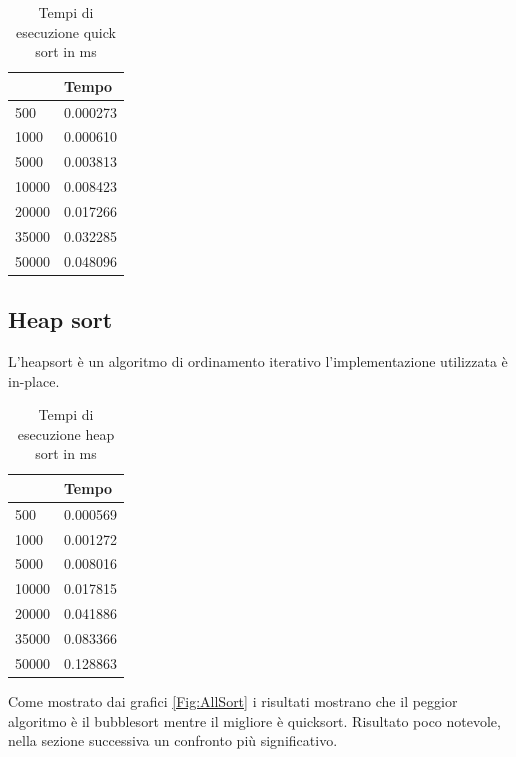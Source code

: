 \documentclass[12pt,a4paper]{report}
\begin{document}
\begin{table}[ht]
\centering
\begin{tabular}{| l | l  |}
\hline
            & Tempo \\ \hline
500   & 0.000273      \\ \hline
1000  & 0.000610      \\ \hline
5000  & 0.003813     \\ \hline
10000 & 0.008423      \\ \hline
20000 & 0.017266     \\ \hline
35000 & 0.032285     \\ \hline
50000 & 0.048096    \\ \hline

\end{tabular}
\caption{Tempi di esecuzione quick sort in ms}
\label{Tab:Tempi esecuzione QuickSort}
\end{table}

\subsection{Heap sort}
L'heapsort è un algoritmo di ordinamento iterativo l'implementazione utilizzata è in-place.

	

\begin{table}[ht]
\centering
\begin{tabular}{| l | l  |}
\hline
            & Tempo \\ \hline
500   & 0.000569      \\ \hline
1000  & 0.001272      \\ \hline
5000  & 0.008016     \\ \hline
10000 & 0.017815      \\ \hline
20000 & 0.041886     \\ \hline
35000 & 0.083366     \\ \hline
50000 & 0.128863    \\ \hline

\end{tabular}
\caption{Tempi di esecuzione heap sort in ms}
\label{Tab:Tempi esecuzione HeapSort}
\end{table}

Come mostrato dai grafici \ref{Fig:AllSort} i risultati mostrano che il peggior algoritmo è il bubblesort mentre il migliore è quicksort.  Risultato poco notevole, nella sezione successiva un confronto più significativo.
\end{document}
